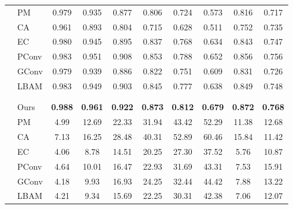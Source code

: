 \documentclass[journal]{IEEEtran}
\begin{document}
\begin{table*}[!ht]
\begin{tabular}{l|l|ccccccc|c}
\hline
         &  PM {\color{black}{\cite{barnes2009patchmatch}}}& 0.979&	0.935&	0.877&	0.806&	0.724&	0.573&	0.816&0.717 \\
         &  CA {\color{black}{\cite{barnes2009patchmatch}}}& 0.961&	0.893&	0.804&	0.715&	0.628&	0.511&	0.752& 0.735\\
         &  EC {\color{black}{\cite{nazeri2019edgeconnect}}} & 0.980&	0.945&	0.895&	0.837&	0.768&	0.634&	0.843&0.747\\
 & PConv {\color{black}{\cite{liu2018image}}} &0.983&	0.951&	0.908&	0.853&	0.788&	0.652&	0.856&0.756  \\
          & GConv {\color{black}{\cite{yu2019free}}} & 0.979 & 0.939 & 0.886 & 0.822 & 0.751 & 0.609 & 0.831 & 0.726\\
          &  LBAM {\color{black}{\cite{chaohaoLBAM2019}}} & 0.983&	0.949&	0.903&	0.845&	0.777&	0.638&	0.849&0.748 \\
          & {\color{black}{PEN-Net \cite{pennet}}} &{\color{black}{0.976}} &{\color{black}{0.910}} &{\color{black}{0.835}} &{\color{black}{0.753}} &{\color{black}{0.6456}} &{\color{black}{0.547}} &{\color{black}{0.778}} & {\color{black}{0.726}}  \\
          & {\color{black}{StructureFlow \cite{structureflow}}}&{\color{black}{0.985}} &{\color{black}{0.957}} &{\color{black}{0.913}} &{\color{black}{0.861}} &{\color{black}{0.796}} &{\color{black}{0.654}} &{\color{black}{0.863}} &{\color{black}{0.767}} \\
          &  Ours  &\textbf{0.988}&\textbf{0.961}&\textbf{0.922}&\textbf{0.873}&	\textbf{0.812}&\textbf{0.679}&\textbf{0.872}&\textbf{0.768}\\
    \hline
          &  PM {\color{black}{\cite{barnes2009patchmatch}}} & 4.99&12.69&22.33&	31.94&43.42&52.29&	11.38&12.68 \\
          &  CA {\color{black}{\cite{barnes2009patchmatch}}}& 7.13&16.25&28.48&	40.31&52.89&60.46&	15.84&11.42\\
          &  EC {\color{black}{\cite{nazeri2019edgeconnect}}} & 4.06&8.78&14.51&20.25&27.30&37.52&	5.76&10.87\\
 & PConv {\color{black}{\cite{liu2018image}}} & 4.64&10.01&16.47&22.93&31.69&	43.31&7.53&15.91\\
          & GConv {\color{black}{\cite{yu2019free}}} & 4.18 & 9.93& 16.93& 24.25& 32.44& 44.42& 7.88 & 13.22\\
          &  LBAM {\color{black}{\cite{chaohaoLBAM2019}}}& 4.21&9.34&15.69&22.25&30.31&42.38&	7.06&12.07 \\

\end{tabular}
\end{table*}
\end{document}
